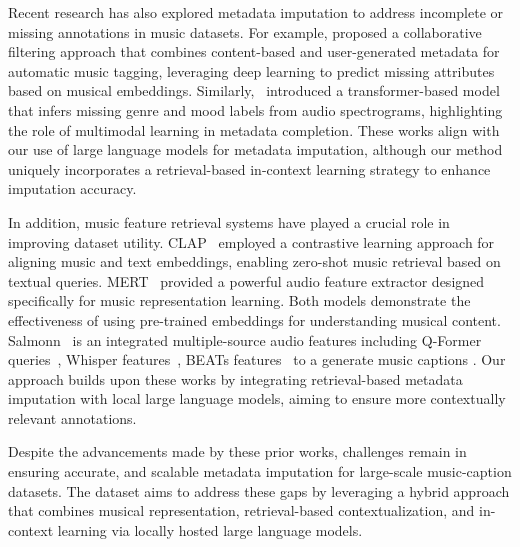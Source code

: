 Recent research has also explored metadata imputation to address incomplete or missing annotations in music datasets. For example, \cite{lee2018deep} proposed a collaborative filtering approach that combines content-based and user-generated metadata for automatic music tagging, leveraging deep learning to predict missing attributes based on musical embeddings. Similarly,~\cite{kim2024missing} introduced a transformer-based model that infers missing genre and mood labels from audio spectrograms, highlighting the role of multimodal learning in metadata completion. These works align with our use of large language models for metadata imputation, although our method uniquely incorporates a retrieval-based in-context learning strategy to enhance imputation accuracy.

In addition, music feature retrieval systems have played a crucial role in improving dataset utility. CLAP~\cite{2022clap} employed a contrastive learning approach for aligning music and text embeddings, enabling zero-shot music retrieval based on textual queries. MERT~\cite{2024mert} provided a powerful audio feature extractor designed specifically for music representation learning. Both models demonstrate the effectiveness of using pre-trained embeddings for understanding musical content. Salmonn~\cite{2024salmonn} is an integrated multiple-source audio features including Q-Former queries~\cite{2023blip}, Whisper features~\cite{2023whisper}, BEATs features~\cite{2023beats} to a generate music captions . Our approach builds upon these works by integrating retrieval-based metadata imputation with local large language models, aiming to ensure more contextually relevant annotations.

Despite the advancements made by these prior works, challenges remain in ensuring accurate, and scalable metadata imputation for large-scale music-caption datasets. The \textbf{\dataset} dataset aims to address these gaps by leveraging a hybrid approach that combines musical representation, retrieval-based contextualization, and in-context learning via locally hosted large language models.